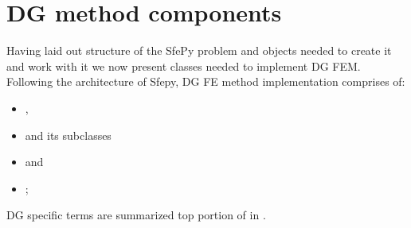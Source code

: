 \section{DG method components}
Having laid out structure of the SfePy problem and objects needed to create it and work 
with it we now present classes needed to implement DG FEM. Following the architecture of 
Sfepy, DG FE method implementation comprises of: 
\begin{itemize}
    \item {}, 
    \item {} and its subclasses
    \item {} and
    \item {};
\end{itemize}
DG specific terms are summarized top portion of in .
